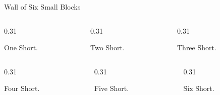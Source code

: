 \documentclass[aspectratio=169]{beamer}
\begin{document}
\begin{frame}{Wall of Six Small Blocks}
  \begin{columns}[T]
    \begin{column}{0.31\textwidth}
      \begin{block}{One}
        {\tiny Short.}
      \end{block}
    \end{column}
    \begin{column}{0.31\textwidth}
      \begin{block}{Two}
        {\tiny Short.}
      \end{block}
    \end{column}
    \begin{column}{0.31\textwidth}
      \begin{block}{Three}
        {\tiny Short.}
      \end{block}
    \end{column}
  \end{columns}
  \vspace{0.2cm}
  \begin{columns}[T]
    \begin{column}{0.31\textwidth}
      \begin{block}{Four}
        {\tiny Short.}
      \end{block}
    \end{column}
    \begin{column}{0.31\textwidth}
      \begin{block}{Five}
        {\tiny Short.}
      \end{block}
    \end{column}
    \begin{column}{0.31\textwidth}
      \begin{block}{Six}
        {\tiny Short.}
      \end{block}
    \end{column}
  \end{columns}
\end{frame}
\end{document}

